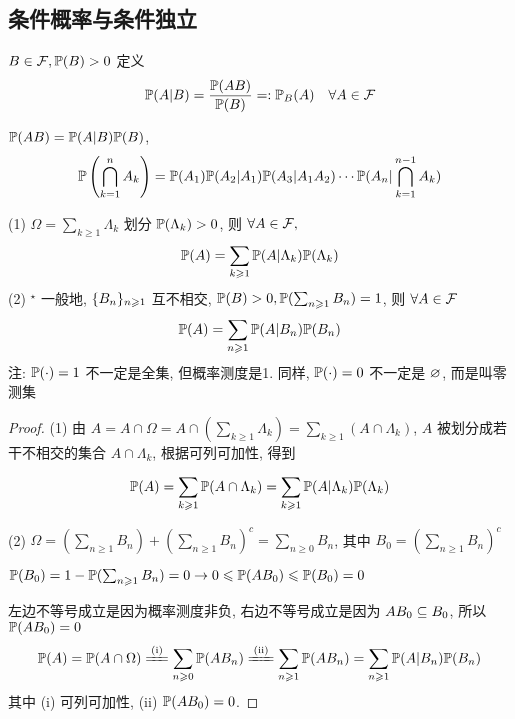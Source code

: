 \subsection{条件概率与条件独立}

\begin{definition}[条件概率]\label{def:con_prob}
    $B\in \mathcal{F}, \mathbb{P}(B)>0$ 定义
    \[
    \mathbb{P}(A|B)=\frac{\mathbb{P}(AB)}{\mathbb{P}(B)}=: \mathbb{P}_B(A)\quad \forall A\in \mathcal{F}
    \]
\end{definition}

\begin{theorem}[乘法公式]\label{thm:multiply_func}
    $\mathbb{P}(AB)=\mathbb{P}(A|B)\mathbb{P}(B)$,
    \begin{equation}
    \mathbb{P}\left(\bigcap_{k=1}^{n}A_k\right)=\mathbb{P}(A_1)\mathbb{P}(A_2|A_1)\mathbb{P}(A_3|A_1A_2)\cdots \mathbb{P}(A_n|\bigcap_{k=1}^{n-1}A_k)
		\label{eq:multiply_func}
		\end{equation}
\end{theorem}

\begin{theorem}[全概公式]\label{thm:law_total_prob}
    (1) $\Omega=\sum_{k\geq 1}\Lambda_k$ 划分 $\mathbb{P}(\Lambda_k)>0$, 则 $\forall A\in \mathcal{F},$
    \[
    \mathbb{P}(A)=\sum_{k\geqslant 1}\mathbb{P}(A|\Lambda_k)\mathbb{P}(\Lambda_k)
    \]
    (2) $^\star$ 一般地, $\{{B}_{n}\}_{n \geqslant 1}$ 互不相交, $\mathbb{P}(B)>0, \mathbb{P}(\sum_{n\geqslant 1}B_n)=1$, 则 $\forall A\in \mathcal{F}$
    \[
    \mathbb{P}(A)=\sum_{n\geqslant 1}\mathbb{P}(A|B_n)\mathbb{P}(B_n)
    \]
    注: $\mathbb{P}(\cdot)=1$ 不一定是全集, 但概率测度是1. 同样, $\mathbb{P}(\cdot)=0$ 不一定是 $\varnothing$, 而是叫零测集
\end{theorem}

\begin{proof}
(1) 由 $A=A\cap\Omega=A\cap (\sum_{k\geq 1}\Lambda_k)=\sum_{k\geq 1}(A\cap \Lambda_k)$, $A$ 被划分成若干不相交的集合 $A\cap \Lambda_k$, 根据可列可加性, 得到 

\[
\mathbb{P}(A)=\sum_{k\geqslant 1}\mathbb{P}(A\cap \Lambda_k)=\sum_{k\geqslant 1}\mathbb{P}(A|\Lambda_k)\mathbb{P}(\Lambda_k)
\]

(2) $\Omega=(\sum_{n\geq 1}B_n)+(\sum_{n\geq 1}B_n)^c=\sum_{n\geq 0}B_n$, 其中 $B_0=(\sum_{n\geq 1}B_n)^c$

$\mathbb{P}(B_0)=1-\mathbb{P}(\sum_{n\geqslant 1}B_n)=0\rightarrow 0\leqslant \mathbb{P}(AB_0)\leqslant \mathbb{P}(B_0)=0$

左边不等号成立是因为概率测度非负, 右边不等号成立是因为 $AB_0\subseteq B_0$, 所以 $\mathbb{P}(AB_0)=0$
\[
\PP(A)
=\PP(A\cap\Omega)
\xlongequal{\text{(i)}}\sum_{n\geq 0}\PP(AB_n)
\xlongequal{\text{(ii)}}\sum_{n\geq 1}\PP(AB_n)
=\sum_{n\geq 1}\PP(A|B_n)\PP(B_n)
\]
其中 (i) 可列可加性, (ii) $\mathbb{P}(AB_0)=0$.
\end{proof}

